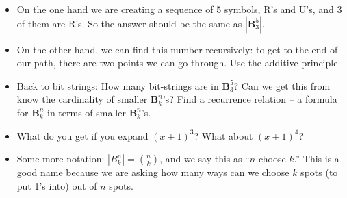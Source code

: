 \documentclass[12pt]{article}
\theoremstyle{plain}
\theoremstyle{definition}
\theoremstyle{remark}
\def\b{\mathbf}
\begin{document}
\begin{itemize}
   \item On the one hand we are creating a sequence of 5 symbols, R's and U's, and 3 of them are R's.  So the answer should be the same as $|\b B^5_3|$.

   \item On the other hand, we can find this number recursively: to get to the end of our path, there are two points we can go through.  Use the additive principle.


   \item Back to bit strings: How many bit-strings are in $\b B^5_3$?  Can we get this from know the cardinality of smaller $\b B^n_k$'s?  Find a recurrence relation -- a formula for $\b B^n_k$ in terms of smaller $\b B^n_k$'s.

	\item What do you get if you expand $(x+1)^3$?  What about $(x+1)^4$?

	\item Some more notation: $|B^n_k| = \binom{n}{k}$, and we say this as ``$n$ choose $k$.''  This is a good name because we are asking how many ways can we choose $k$ spots (to put 1's into) out of $n$ spots.


 \end{itemize}
\end{document}
